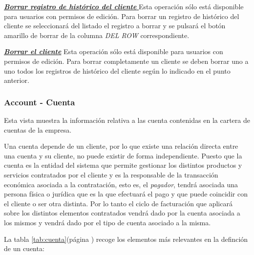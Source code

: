 \underline{\textsl{\textbf{Borrar registro de histórico del cliente }}}\newline
Esta operación sólo está disponible para usuarios con permisos de edición.
Para borrar un registro de histórico del cliente se seleccionará del listado el registro a borrar y se pulsará el botón amarillo de borrar de la columna \textit{DEL ROW} correspondiente.\newline

\underline{\textsl{\textbf{Borrar el cliente}}}\newline
Esta operación sólo está disponible para usuarios con permisos de edición.
Para borrar completamente un cliente se deben borrar uno a uno todos los registros de histórico del cliente según lo indicado en el punto anterior. 





\subsubsection{Account - Cuenta}
\label{sub:account}

Esta vista muestra la información relativa a las cuenta contenidas en la cartera de cuentas de la empresa.

Una cuenta depende de un cliente, por lo que existe una relación directa entre una cuenta y su cliente, no puede existir de forma independiente. Puesto que la cuenta es la entidad del sistema que permite gestionar los distintos productos y servicios contratados por el cliente y es la responsable de la transacción económica asociada a la contratación, esto es, el \textit{pagador}, tendrá asociada una persona física o jurídica que es la que efectuará el pago y que puede coincidir con el cliente o ser otra distinta. Por lo tanto el ciclo de facturación que aplicará sobre los distintos elementos contratados vendrá dado por la cuenta asociada a los mismos y vendrá dado por el tipo de cuenta asociado a la misma.


La tabla \ref{tab:cuenta}(página \pageref{tab:cuenta}) recoge los elementos más relevantes en la definción de un cuenta:

